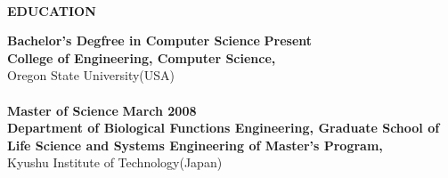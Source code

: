 \begin{center}
    \hrulefill \\
    \begin{large}
        \textbf{EDUCATION} \\
    \end{large} 
\end{center}
\textbf{Bachelor's Degfree in Computer Science} \hfill \textbf{Present}\\
\textbf{College of Engineering, Computer Science,} \\
Oregon State University(USA)\\
\\
\textbf{Master of Science} \hfill \textbf{March 2008}\\
\textbf{Department of Biological Functions Engineering, Graduate School of Life Science and 
Systems Engineering of Master’s Program,} \\
Kyushu Institute of Technology(Japan)